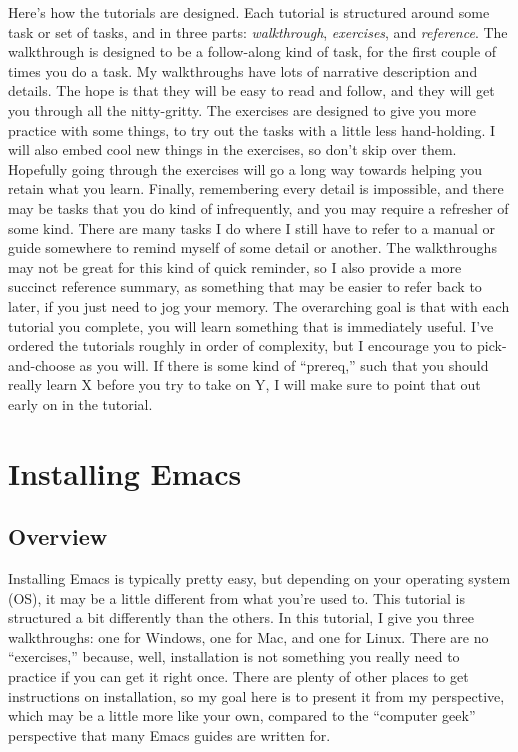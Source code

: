 \documentclass{article}
\begin{document}
Here's how the tutorials are designed.  Each tutorial is structured around some task or set of tasks, and in three parts: \emph{walkthrough}, \emph{exercises}, and \emph{reference}.  The walkthrough is designed to be a follow-along kind of task, for the first couple of times you do a task. My walkthroughs have lots of narrative description and details. The hope is that they will be easy to read and follow, and they will get you through all the nitty-gritty. The exercises are designed to give you more practice with some things, to try out the tasks with a little less hand-holding. I will also embed cool new things in the exercises, so don't skip over them.  Hopefully going through the exercises will go a long way towards helping you retain what you learn.  Finally, remembering every detail is impossible, and there may be tasks that you do kind of infrequently, and you may require a refresher of some kind.  There are many tasks I do where I still have to refer to a manual or guide somewhere to remind myself of some detail or another. The walkthroughs may not be great for this kind of quick reminder, so I also provide a more succinct reference summary, as something that may be easier to refer back to later, if you just need to jog your memory.  The overarching goal is that with each tutorial you complete, you will learn something that is immediately useful.  I've ordered the tutorials roughly in order of complexity, but I encourage you to pick-and-choose as you will. If there is some kind of ``prereq,'' such that you should really learn X before you try to take on Y, I will make sure to point that out early on in the tutorial.
\section{Installing Emacs}
\label{sec-3}
\subsection{Overview}
\label{sec-3-1}

Installing Emacs is typically pretty easy, but depending on your operating system (OS), it may be a little different from what you're used to. This tutorial is structured a bit differently than the others. In this tutorial, I give you three walkthroughs: one for Windows, one for Mac, and one for Linux.  There are no ``exercises,'' because, well, installation is not something you really need to practice if you can get it right once. There are plenty of other places to get instructions on installation, so my goal here is to present it from my perspective, which may be a little more like your own, compared to the ``computer geek'' perspective that many Emacs guides are written for.
\end{document}

